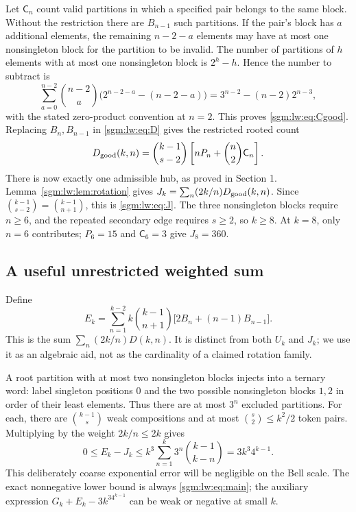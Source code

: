 \documentclass[11pt,letterpaper]{article}
\theoremstyle{remark}\newtheorem{remark}[theorem]{Remark}
\newcommand{\Cgood}{\mathsf C}\DeclareMathOperator{\norm}{norm}
\theoremstyle{definition}\newtheorem{definition}[theorem]{Definition}
\begin{document}
Let $\Cgood_n$ count valid partitions in which a specified pair belongs to the same block. Without the restriction there are $B_{n-1}$ such partitions. If the pair's block has $a$ additional elements, the remaining $n-2-a$ elements may have at most one nonsingleton block for the partition to be invalid. The number of partitions of $h$ elements with at most one nonsingleton block is $2^h-h$. Hence the number to subtract is
\[
 \sum_{a=0}^{n-2}\binom{n-2}{a}
       \bigl(2^{n-2-a}-(n-2-a)\bigr)
 =3^{n-2}-(n-2)2^{n-3},
\]
with the stated zero-product convention at $n=2$. This proves \eqref{sgm:lw:eq:Cgood}. Replacing $B_n,B_{n-1}$ in \eqref{sgm:lw:eq:D} gives the restricted rooted count
\begin{equation}\label{sgm:lw:eq:Dgood}
 D_{\rm good}(k,n)=\binom{k-1}{s-2}
              \left[nP_n+\binom n2\Cgood_n\right].
\end{equation}
There is now exactly one admissible hub, as proved in Section 1. Lemma~\ref{sgm:lw:lem:rotation} gives $J_k=\sum_n(2k/n)D_{\rm good}(k,n)$. Since $\binom{k-1}{s-2}=\binom{k-1}{n+1}$, this is \eqref{sgm:lw:eq:J}. The three nonsingleton blocks require $n\ge6$, and the repeated secondary edge requires $s\ge2$, so $k\ge8$. At $k=8$, only $n=6$ contributes; $P_6=15$ and $\Cgood_6=3$ give $J_8=360$.

\subsection{A useful unrestricted weighted sum}
Define
\begin{equation}\label{sgm:lw:eq:E}
 E_k=\sum_{n=1}^{k-2}k\binom{k-1}{n+1}
                    \bigl[2B_n+(n-1)B_{n-1}\bigr].
\end{equation}
This is the sum $\sum_n(2k/n)D(k,n)$. It is distinct from both $U_k$ and $J_k$; we use it as an algebraic aid, not as the cardinality of a claimed rotation family.

A root partition with at most two nonsingleton blocks injects into a ternary word: label singleton positions $0$ and the two possible nonsingleton blocks $1,2$ in order of their least elements. Thus there are at most $3^n$ excluded partitions. For each, there are $\binom{k-1}{s}$ weak compositions and at most $\binom s2\le k^2/2$ token pairs. Multiplying by the weight $2k/n\le2k$ gives
\begin{equation}\label{sgm:lw:eq:cost}
 0\le E_k-J_k
 \le k^3\sum_{n=1}^k3^n\binom{k-1}{k-n}
 =3k^3 4^{k-1}.
\end{equation}
This deliberately coarse exponential error will be negligible on the Bell scale. The exact nonnegative lower bound is always \eqref{sgm:lw:eq:main}; the auxiliary expression $G_k+E_k-3k^34^{k-1}$ can be weak or negative at small $k$.
\end{document}
